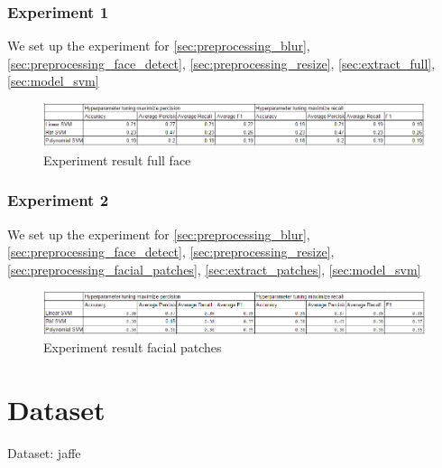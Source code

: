 \documentclass[a4paper, 12pt]{article}
\begin{document}
		\subsubsection{Experiment 1}
		We set up the experiment for \ref{sec:preprocessing_blur}, \ref{sec:preprocessing_face_detect}, \ref{sec:preprocessing_resize}, \ref{sec:extract_full}, \ref{sec:model_svm}
		\begin{figure}[H]
			\centering
			\includegraphics[width=1\linewidth]{./figure/experiment_result.png}
			\caption[]{Experiment result full face}
			\label{fig:result}
		\end{figure}
	
		\subsubsection{Experiment 2}
			We set up the experiment for \ref{sec:preprocessing_blur}, \ref{sec:preprocessing_face_detect}, \ref{sec:preprocessing_resize}, \ref{sec:preprocessing_facial_patches}, \ref{sec:extract_patches}, \ref{sec:model_svm}
			\begin{figure}[H]
				\centering
				\includegraphics[width=1\linewidth]{./figure/experiment2.png}
				\caption[]{Experiment result facial patches}
				\label{fig:result2}
			\end{figure}
		
\section{Dataset}
Dataset:  jaffe \cite{lyons1998japanese}





\end{document}

